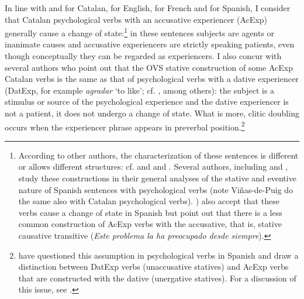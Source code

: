 \documentclass[output=paper,colorlinks,citecolor=brown,modfonts,nonflat]{langsci/langscibook}
\begin{document}
In line with \citet{Ynglès1991, CabréMateu1998, Rossello2008} and \citet[Section 21.5]{GIEC2016} for Catalan, \citet{Pesetsky1995} for English, \citet{Bouchard1995} for French and \citet{Acedo-MatellánMateu2015} for Spanish, I consider that Catalan psychological verbs with an accusative experiencer (AcExp) generally cause a change of state:\footnote{According to other authors, the characterization of these sentences is different or allows different structures: cf. \citet{vanVoorst1992, Arad1999, Landau2010} and \citet{MarínMcNally2011} and \citet{Fabregas2015experimentante}. Several authors, including \citet{FabregasMarín2012,FábregasMarínMcNally2012,MarínSanchezMarco2012,Ganeshan2014} and \citet{Viñas-de-Puig2014}, study these constructions in their general analyses of the stative and eventive nature of Spanish sentences with psychological verbs (note Viñas-de-Puig do the same also with Catalan psychological verbs). \citet[83 (4)]{Acedo-MatellánMateu2015}) also accept that these verbs cause a change of state in Spanish but point out that there is a less common construction of AcExp verbs with the accusative, that is, stative causative transitive (\textit{Este problema la ha preocupado desde siempre}).} in these sentences subjects are agents or inanimate causes and accusative experiencers are strictly speaking patients, even though conceptually they can be regarded as experiencers. I also concur with several authors who point out that the OVS stative construction of some AcExp Catalan verbs is the same as that of psychological verbs with a dative experiencer (DatExp, for example \textit{agradar} ‘to like’; cf. \citealt{CabréMateu1998, Ramos2004, Rossello2008, Cuervo2010Cuestiones}, among others): the subject is a stimulus or source of the psychological experience and the dative experiencer is not a patient, it does not undergo a change of state. What is more, clitic doubling occurs when the experiencer phrase appears in preverbal position.\footnote{\citet{Acedo-MatellánMateu2015} have questioned this assumption in psychological verbs in Spanish and draw a distinction between DatExp verbs (unaccusative statives) and AcExp verbs that are constructed with the dative (unergative statives). For a discussion of this issue, see \citet[Section 6.2.4.1]{Royo2017}.}
\end{document}
